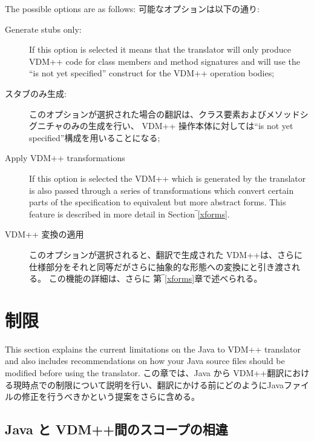 \documentclass[\pformat,12pt]{jarticle}
\begin{document}
The possible options are as follows:
可能なオプションは以下の通り:
\begin{description}
\item[Generate stubs only:]
If this option is selected it means that the translator will only
produce VDM++ code for class members and method signatures and will
use the ``is not yet specified'' construct for the VDM++ operation
bodies; 
\item[スタブのみ生成:]
このオプションが選択された場合の翻訳は、クラス要素およびメソッドシグニチャのみの生成を行い、  VDM++ 操作本体に対しては``is not yet specified''構成を用いることになる; 
\item[Apply VDM++ transformations] If this option is selected the
  VDM++ which is generated by the translator is also passed through a
  series of transformations which convert certain parts of the
  specification to equivalent but more abstract forms. This feature is
  described in more detail in Section‾\ref{xforms}. 
\item[VDM++ 変換の適用] このオプションが選択されると、翻訳で生成された VDM++は、さらに仕様部分をそれと同等だがさらに抽象的な形態への変換にと引き渡される。
この機能の詳細は、さらに 第‾\ref{xforms}章で述べられる。
\end{description}

\section{制限}\label{limitations}

This section explains the current limitations on the Java to VDM++
translator and also includes recommendations on how your Java
source files should be modified before using the translator.
この章では、Java から VDM++翻訳における現時点での制限について説明を行い、翻訳にかける前にどのようにJavaファイルの修正を行うべきかという提案をさらに含める。

\subsection{Java と VDM++間のスコープの相違}
\end{document}
